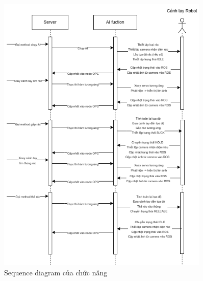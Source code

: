 \begin{figure}[!h]
    \centering
    \includegraphics[width=0.9\textwidth]{Images/Implementation/AI/AI-sequence.png}
    \caption{Sequence diagram của chức năng}
\end{figure}

